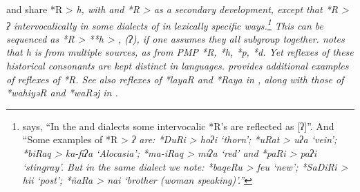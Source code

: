  and  share *R > \it{h},
with  and  *R > {\0} as a secondary development,
except that *R > ʔ intervocalically in some dialects of 
in lexically specific ways.\footnote{
\cite[33, 43]{Collins1981} says,
“In the  and  dialects some intervocalic *R's are reflected as [ʔ]”.
And “Some examples of *R > \it{ʔ} are: *DuRi > \it{hoʔi} ‘thorn’;
*uRat > \it{uʔa} ‘vein’; *biRaq > \it{ka-fiʔa} ‘Alocasia’; *ma-iRaq
> \it{miʔa} ‘red’ and *paRi > \it{paʔi} ‘stingray’.
But in the same dialect we note: *baqeRu > \it{feu} ‘new’; *SaDiRi
> \it{hii} ‘post’; *ñaRa > \it{nai} ‘brother (woman speaking)’.”}
  This can be sequenced as *R > **h > {\0},
(\it{ʔ}), if one assumes they all subgroup together.
\citet{Blust1981} notes that  \it{h} is from multiple sources,
as from PMP *R, *h, *p, *d.
Yet reflexes of these historical consonants
are kept distinct in  languages.
 provides additional examples of reflexes of *R.
See also reflexes of *layaR
and *Raya in ,
along with those of *wahiyəR
and *waRəj in .

